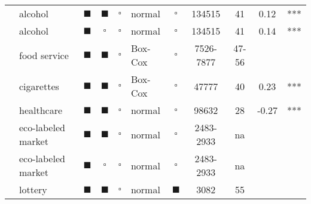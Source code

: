 \begin{landscape}
\begin{center}
\begin{footnotesize}
\begin{longtable}{llccclccccc}
  \cite{ARIS:PERA:PIER:08} & alcohol & $\blacksquare$ & $\blacksquare$ & $\square$ & normal & $\square$ & 134515 & 41 & 0.12 & *** \\ 
  \cite{ARIS:PERA:PIER:08} & alcohol & $\blacksquare$ & $\square$ & $\square$ & normal & $\square$ & 134515 & 41 & 0.14 & *** \\ 
  \cite{KEEL:HENCH:NEWM:09} & food service & $\blacksquare$ & $\blacksquare$ & $\square$ & Box-Cox & $\square$ & 7526-7877 & 47-56 &  &  \\ 
  \cite{ARIS:PIER:09} & cigarettes & $\blacksquare$ & $\blacksquare$ & $\square$ & Box-Cox & $\square$ & 47777 & 40 & 0.23 & *** \\ 
  \cite{OKUN:SURA:BENS:10} & healthcare & $\blacksquare$ & $\blacksquare$ & $\square$ & normal & $\square$ & 98632 & 28 & -0.27 & *** \\ 
  \cite{BROU:KHAN:12} & eco-labeled market & $\blacksquare$ & $\blacksquare$ & $\square$ & normal & $\square$ &  2483-2933 & na &  &  \\ 
  \cite{BROU:KHAN:12} & eco-labeled market & $\blacksquare$ & $\square$ & $\square$ & normal & $\square$ &  2483-2933 & na &  &  \\ 
  \cite{CROW:EAKI:JORD:12} & lottery & $\blacksquare$ & $\blacksquare$ & $\square$ & normal & $\blacksquare$ & 3082 & 55 &  &  \\ 
  \hline
\end{longtable}%
\end{footnotesize}
\end{center}
\end{landscape}
